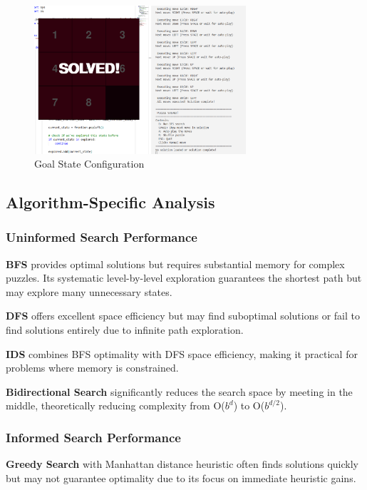 \documentclass[11pt,a4paper]{article}
\begin{document}
\begin{figure}[H]
\centering
\includegraphics[width=0.7\textwidth]{../searches/bfs_8_puzzle/End_state.png}
\caption{Goal State Configuration}
\end{figure}

\subsection{Algorithm-Specific Analysis}

\subsubsection{Uninformed Search Performance}

\textbf{BFS} provides optimal solutions but requires substantial memory for complex puzzles. Its systematic level-by-level exploration guarantees the shortest path but may explore many unnecessary states.

\textbf{DFS} offers excellent space efficiency but may find suboptimal solutions or fail to find solutions entirely due to infinite path exploration.

\textbf{IDS} combines BFS optimality with DFS space efficiency, making it practical for problems where memory is constrained.

\textbf{Bidirectional Search} significantly reduces the search space by meeting in the middle, theoretically reducing complexity from O($b^d$) to O($b^{d/2}$).

\subsubsection{Informed Search Performance}

\textbf{Greedy Search} with Manhattan distance heuristic often finds solutions quickly but may not guarantee optimality due to its focus on immediate heuristic gains.
\end{document}
